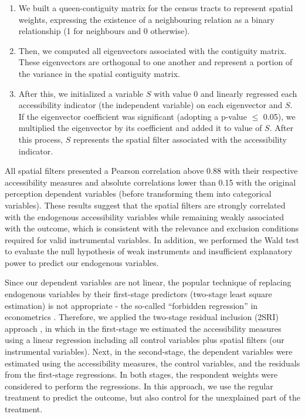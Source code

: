 \documentclass[preprint, 3p,
authoryear]{elsarticle} %
\providecommand{\tightlist}{%
  \setlength{\itemsep}{0pt}\setlength{\parskip}{0pt}}
\begin{document}
\begin{enumerate}
\def\labelenumi{\arabic{enumi}.}
\tightlist
\item
  We built a queen-contiguity matrix for the census tracts to represent
  spatial weights, expressing the existence of a neighbouring relation
  as a binary relationship (1 for neighbours and 0 otherwise).
\item
  Then, we computed all eigenvectors associated with the contiguity
  matrix. These eigenvectors are orthogonal to one another and represent
  a portion of the variance in the spatial contiguity matrix.
\item
  After this, we initialized a variable \(S\) with value \(0\) and
  linearly regressed each accessibility indicator (the independent
  variable) on each eigenvector and \(S\). If the eigenvector
  coefficient was significant (adopting a p-value \(\leq\) 0.05), we
  multiplied the eigenvector by its coefficient and added it to value of
  \(S\). After this process, \(S\) represents the spatial filter
  associated with the accessibility indicator.
\end{enumerate}

All spatial filters presented a Pearson correlation above 0.88 with
their respective accessibility measures and absolute correlations lower
than 0.15 with the original perception dependent variables (before
transforming them into categorical variables). These results suggest
that the spatial filters are strongly correlated with the endogenous
accessibility variables while remaining weakly associated with the
outcome, which is consistent with the relevance and exclusion conditions
required for valid instrumental variables. In addition, we performed the
Wald test to evaluate the null hypothesis of weak instruments and
insufficient explanatory power to predict our endogenous variables.

Since our dependent variables are not linear, the popular technique of
replacing endogenous variables by their first-stage predictors
(two-stage least square estimation) is not appropriate - the so-called
``forbidden regression'' in econometrics
\citep{wooldridge2010, cunningham2021causal, huntington-klein2021}.
Therefore, we applied the two-stage residual inclusion (2SRI) approach
\citep{terza2008}, in which in the first-stage we estimated the
accessibility measures using a linear regression including all control
variables plus spatial filters (our instrumental variables). Next, in
the second-stage, the dependent variables were estimated using the
accessibility measures, the control variables, and the residuals from
the first-stage regressions. In both stages, the respondent weights were
considered to perform the regressions. In this approach, we use the
regular treatment to predict the outcome, but also control for the
unexplained part of the treatment.
\end{document}
